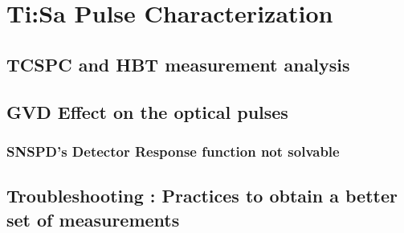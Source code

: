 \chapter{Ti:Sa Pulse Characterization}
\section{TCSPC and HBT measurement analysis}
\section{GVD Effect on the optical pulses}
\subsection{SNSPD's Detector Response function not solvable}
\section{Troubleshooting : Practices to obtain a better set of measurements}
